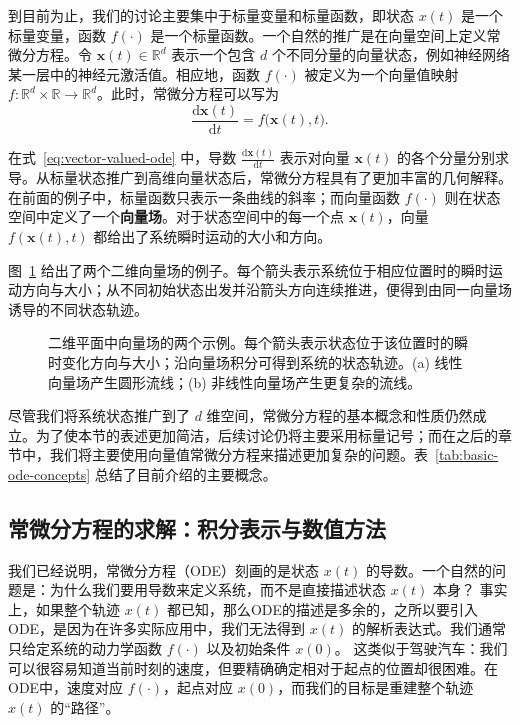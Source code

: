 \documentclass[UTF8,a4paper,zihao=-4,oneside,openany]{ctexbook}
\makeatletter
\newcommand{\AMLFigure}[2][0.96\linewidth]{%
  \begingroup
  \let\AtBeginDocument\@gobble
  \endgroup
}
\makeatother
\begin{document}
到目前为止，我们的讨论主要集中于标量变量和标量函数，即状态 \(x(t)\) 是一个标量变量，函数 \(f(\cdot)\) 是一个标量函数。一个自然的推广是在向量空间上定义常微分方程。令 \(\boldsymbol{x}(t)\in\mathbb{R}^{d}\) 表示一个包含 \(d\) 个不同分量的向量状态，例如神经网络某一层中的神经元激活值。相应地，函数 \(f(\cdot)\) 被定义为一个向量值映射 \(f:\mathbb{R}^{d}\times\mathbb{R}\rightarrow\mathbb{R}^{d}\)。此时，常微分方程可以写为
\begin{equation}
\frac{\mathrm{d}\boldsymbol{x}(t)}{\mathrm{d}t}
=
f\bigl(\boldsymbol{x}(t),t\bigr).
\label{eq:vector-valued-ode}
\end{equation}

在式~\eqref{eq:vector-valued-ode} 中，导数 \(\frac{\mathrm{d}\boldsymbol{x}(t)}{\mathrm{d}t}\) 表示对向量 \(\boldsymbol{x}(t)\) 的各个分量分别求导。从标量状态推广到高维向量状态后，常微分方程具有了更加丰富的几何解释。在前面的例子中，标量函数只表示一条曲线的斜率；而向量函数 \(f(\cdot)\) 则在状态空间中定义了一个\textbf{向量场}。对于状态空间中的每一个点 \(\boldsymbol{x}(t)\)，向量 \(f(\boldsymbol{x}(t),t)\) 都给出了系统瞬时运动的大小和方向。

图~\ref{fig:vector-field-examples} 给出了两个二维向量场的例子。每个箭头表示系统位于相应位置时的瞬时运动方向与大小；从不同初始状态出发并沿箭头方向连续推进，便得到由同一向量场诱导的不同状态轨迹。

\begin{figure}[!t]
\centering
\AMLFigure{figure-vector-field-examples}
\caption{二维平面中向量场的两个示例。每个箭头表示状态位于该位置时的瞬时变化方向与大小；沿向量场积分可得到系统的状态轨迹。(a) 线性向量场产生圆形流线；(b) 非线性向量场产生更复杂的流线。}
\label{fig:vector-field-examples}
\end{figure}

尽管我们将系统状态推广到了 \(d\) 维空间，常微分方程的基本概念和性质仍然成立。为了使本节的表述更加简洁，后续讨论仍将主要采用标量记号；而在之后的章节中，我们将主要使用向量值常微分方程来描述更加复杂的问题。表~\ref{tab:basic-ode-concepts} 总结了目前介绍的主要概念。























\subsection{常微分方程的求解：积分表示与数值方法}
我们已经说明，常微分方程（ODE）刻画的是状态 $x(t)$ 的导数。一个自然的问题是：为什么我们要用导数来定义系统，而不是直接描述状态 $x(t)$ 本身？
事实上，如果整个轨迹 $x(t)$ 都已知，那么ODE的描述是多余的，之所以要引入 ODE，是因为在许多实际应用中，我们无法得到 $x(t)$ 的解析表达式。我们通常只给定系统的动力学函数 $f(\cdot)$ 以及初始条件 $x(0)$。
这类似于驾驶汽车：我们可以很容易知道当前时刻的速度，但要精确确定相对于起点的位置却很困难。在ODE中，速度对应 $f(\cdot)$，起点对应 $x(0)$，而我们的目标是重建整个轨迹 $x(t)$ 的“路径”。
\end{document}
